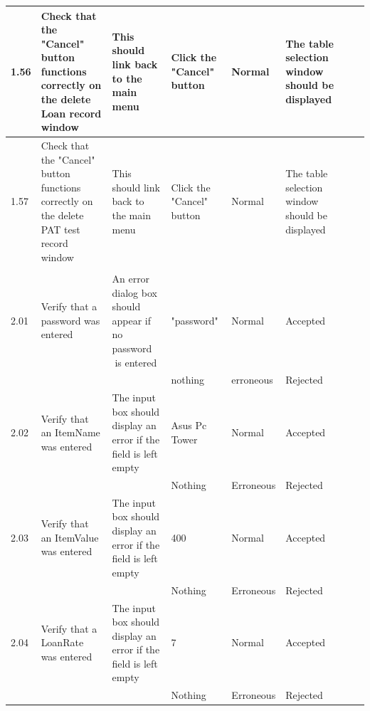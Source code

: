 \begin{landscape}
\begin{center}
\begin{longtable}{|p{1.5cm}|p{2cm}|p{3cm}|p{2cm}|p{2cm}|p{2.5cm}|p{2cm}|p{2cm}|}
        1.56 & Check that the "Cancel" button functions correctly on the delete Loan record window & This should link back to the main menu & Click the "Cancel" 
        button & Normal & The table selection window should be displayed & & \\ \hline
        
        1.57 & Check that the "Cancel" button functions correctly on the delete PAT test record window & This should link back to the main menu & Click the "Cancel" 
        button & Normal & The table selection window should be displayed & & \\ \hline
        
        & & & & & & & \\ \hline
        
        2.01 & Verify that a password was entered & An error dialog box should appear if no password is entered & "password" & Normal & Accepted & & \\
             &                                    &                                                             &  nothing   & erroneous & Rejected & & \\ \hline
             
        2.02 & Verify that an ItemName was entered & The input box should display an error if the field is left empty & Asus Pc Tower & Normal & Accepted & & \\   
             &                                     &                                                               & Nothing       & Erroneous & Rejected & & \\ \hline
             
        2.03 & Verify that an ItemValue was entered & The input box should display an error if the field is left empty & 400 & Normal & Accepted & & \\   
             &                                     &                                                               & Nothing       & Erroneous & Rejected & & \\ \hline
             
        2.04 & Verify that a LoanRate was entered & The input box should display an error if the field is left empty & 7 & Normal & Accepted & & \\   
             &                                     &                                                               & Nothing       & Erroneous & Rejected & & \\ \hline
             

\end{longtable}
\end{center}
\end{landscape}
